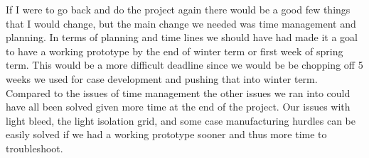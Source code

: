 \documentclass[onecolumn, draftclsnofoot,10pt, compsoc]{IEEEtran}
\begin{document}
If I were to go back and do the project again there would be a good few things that I would change, but the main change we needed was time management and planning.
In terms of planning and time lines we should have had made it a goal to have a working prototype by the end of winter term or first week of spring term.
This would be a more difficult deadline since we would be be chopping off 5 weeks we used for case development and pushing that into winter term.
Compared to the issues of time management the other issues we ran into could have all been solved given more time at the end of the project.
Our issues with light bleed, the light isolation grid, and some case manufacturing hurdles can be easily solved if we had a working prototype sooner and thus more time to troubleshoot.

\newpage


\end{document}

